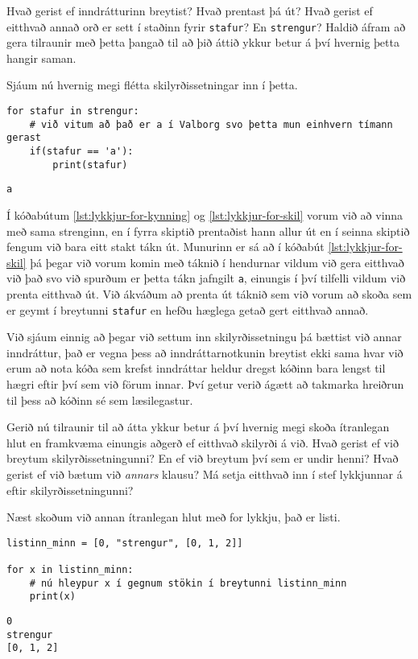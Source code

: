 Hvað gerist ef inndrátturinn breytist?
Hvað prentast þá út?
Hvað gerist ef eitthvað annað orð er sett í staðinn fyrir \texttt{stafur}?
En \texttt{strengur}?
Haldið áfram að gera tilraunir með þetta þangað til að þið áttið ykkur betur á því hvernig þetta hangir saman.

Sjáum nú hvernig megi flétta skilyrðissetningar inn í þetta.

\lstset{style=venjulegt}
\begin{lstlisting}[caption=For lykkja og skilyrðissetningar, label=lst:lykkjur-for-skil]
for stafur in strengur:
	# við vitum að það er a í Valborg svo þetta mun einhvern tímann gerast
	if(stafur == 'a'):
		print(stafur)
\end{lstlisting}
\lstset{style=uttak}
\begin{lstlisting}
a
\end{lstlisting}

Í kóðabútum \ref{lst:lykkjur-for-kynning} og \ref{lst:lykkjur-for-skil} vorum við að vinna með sama strenginn, en í fyrra skiptið prentaðist hann allur út en í seinna skiptið fengum við bara eitt stakt tákn út.
Munurinn er sá að í kóðabút \ref{lst:lykkjur-for-skil} þá þegar við vorum komin með táknið í hendurnar vildum við gera eitthvað við það svo við spurðum er þetta tákn jafngilt \texttt{a}, einungis í því tilfelli vildum við prenta eitthvað út.
Við ákváðum að prenta út táknið sem við vorum að skoða sem er geymt í breytunni \texttt{stafur} en hefðu hæglega getað gert eitthvað annað.

Við sjáum einnig að þegar við settum inn skilyrðissetningu þá bættist við annar inndráttur, það er vegna þess að inndráttarnotkunin breytist ekki sama hvar við erum að nota kóða sem krefst inndráttar heldur dregst kóðinn bara lengst til hægri eftir því sem við förum innar. 
Því getur verið ágætt að takmarka hreiðrun til þess að kóðinn sé sem læsilegastur.

Gerið nú tilraunir til að átta ykkur betur á því hvernig megi skoða ítranlegan hlut en framkvæma einungis aðgerð ef eitthvað skilyrði á við.
Hvað gerist ef við breytum skilyrðissetningunni?
En ef við breytum því sem er undir henni?
Hvað gerist ef við bætum við \textit{annars} klausu?
Má setja eitthvað inn í stef lykkjunnar á eftir skilyrðissetningunni?

Næst skoðum við annan ítranlegan hlut með for lykkju, það er listi.

\lstset{style=venjulegt}	
	
\begin{lstlisting}[caption=For lykkja með lista, label=lst:lykkjur-for-listi]
listinn_minn = [0, "strengur", [0, 1, 2]]

for x in listinn_minn:
	# nú hleypur x í gegnum stökin í breytunni listinn_minn
	print(x)

\end{lstlisting}
\lstset{style=uttak}
\begin{lstlisting}	
0
strengur
[0, 1, 2]
\end{lstlisting}



